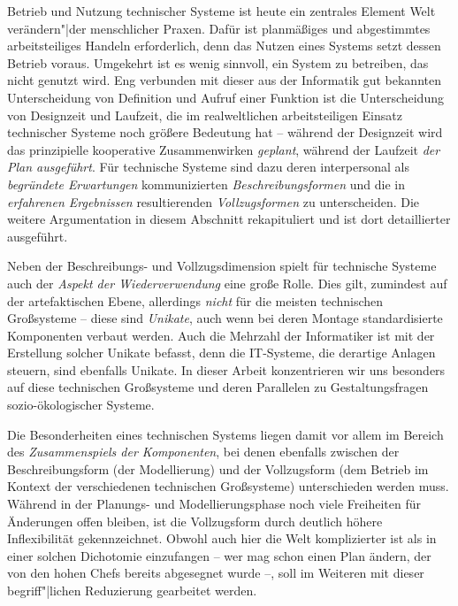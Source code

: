 \documentclass[12pt,a4paper]{article}
\begin{document}
Betrieb und Nutzung technischer Systeme ist heute ein zentrales Element Welt
verändern"|der menschlicher Praxen. Dafür ist planmäßiges und abgestimmtes
arbeitsteiliges Handeln erforderlich, denn das Nutzen eines Systems setzt
dessen Betrieb voraus.  Umgekehrt ist es wenig sinnvoll, ein System zu
betreiben, das nicht genutzt wird. Eng verbunden mit dieser aus der Informatik
gut bekannten Unterscheidung von Definition und Aufruf einer Funktion ist die
Unterscheidung von Designzeit und Laufzeit, die im realweltlichen
arbeitsteiligen Einsatz technischer Systeme noch größere Bedeutung hat --
während der Designzeit wird das prinzipielle kooperative Zusammenwirken
\emph{geplant}, während der Laufzeit \emph{der Plan ausgeführt}. Für
technische Systeme sind dazu deren interpersonal als \emph{begründete
  Erwartungen} kommunizierten \emph{Beschreibungsformen} und die in
\emph{erfahrenen Ergebnissen} resultierenden \emph{Vollzugsformen} zu
unterscheiden.  Die weitere Argumentation in diesem Abschnitt rekapituliert
\cite{Graebe2020b} und ist dort detaillierter ausgeführt.

Neben der Beschreibungs- und Vollzugsdimension spielt für technische Systeme
auch der \emph{Aspekt der Wiederverwendung} eine große Rolle.  Dies gilt,
zumindest auf der artefaktischen Ebene, allerdings \emph{nicht} für die
meisten technischen Großsysteme -- diese sind \emph{Unikate}, auch wenn bei
deren Montage standardisierte Komponenten verbaut werden. Auch die Mehrzahl
der Informatiker ist mit der Erstellung solcher Unikate befasst, denn die
IT-Systeme, die derartige Anlagen steuern, sind ebenfalls Unikate.  In dieser
Arbeit konzentrieren wir uns besonders auf diese technischen Großsysteme und
deren Parallelen zu Gestaltungsfragen sozio-ökologischer Systeme.

Die Besonderheiten eines technischen Systems liegen damit vor allem im Bereich
des \emph{Zusammenspiels der Komponenten}, bei denen ebenfalls zwischen der
Beschreibungsform (der Modellierung) und der Vollzugsform (dem Betrieb im
Kontext der verschiedenen technischen Großsysteme) unterschieden werden muss.
Während in der Planungs- und Modellierungsphase noch viele Freiheiten für
Änderungen offen bleiben, ist die Vollzugsform durch deutlich höhere
Inflexibilität gekennzeichnet.  Obwohl auch hier die Welt komplizierter ist
als in einer solchen Dichotomie einzufangen -- wer mag schon einen Plan
ändern, der von den hohen Chefs bereits abgesegnet wurde --, soll im Weiteren
mit dieser begriff"|lichen Reduzierung gearbeitet werden.
\end{document}

